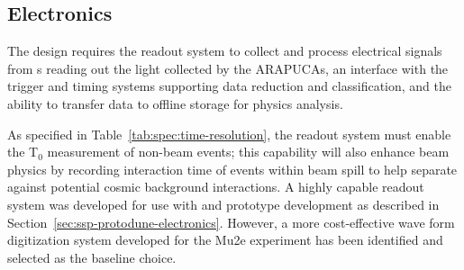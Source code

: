 

\subsection{Electronics}
\label{sec:fdsp-pd-pde}




The  design requires the readout system to collect and process electrical signals from s reading out the light collected by the ARAPUCAs, an interface with the trigger and timing systems supporting data reduction and classification, and the ability to transfer data to offline storage for physics analysis.

As specified in Table~\ref{tab:spec:time-resolution}, the readout system must enable the T$_0$ measurement of non-beam events; this capability will also enhance beam physics by recording interaction time of events within 
beam spill to help separate against potential cosmic background interactions. A highly capable readout system was developed for use with  and prototype development as described in Section~\ref{sec:ssp-protodune-electronics}. However, a more cost-effective wave form digitization system developed for the Mu2e experiment has been identified and selected as the baseline choice. 



